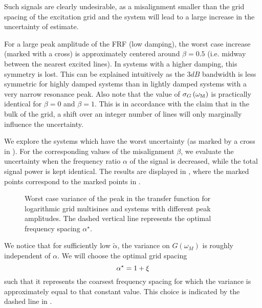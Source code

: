   Such signals are clearly undesirable, as a misalignment smaller than the grid spacing of the excitation grid and the system will lead to a large increase in the uncertainty of estimate.
  
  For a large peak amplitude of the FRF (low damping), the worst case increase (marked with a cross) is approximately centered around $\beta = 0.5$ (i.e. midway between the nearest excited lines).
  In systems with a higher damping, this symmetry is lost.
  This can be explained intuitively as the $3\unit{dB}$ bandwidth is less symmetric for highly damped systems than in lightly damped systems with a very narrow resonance peak.
  Also note that the value of $\sigma_G\left(\omega_{\mathrm{M}} \right)$ is practically identical for $\beta=0$ and $\beta=1$.
  This is in accordance with the claim that in the bulk of the grid, a shift over an integer number of lines will only marginally influence the uncertainty.
  
  We explore the systems which have the worst uncertainty (as marked by a cross in ).
  For the corresponding values of the misalignment $\beta$, we evaluate the uncertainty when the frequency ratio $\alpha$ of the signal is decreased, while the total signal power is kept identical.
  The results are displayed in , where the marked points correspond to the marked points in .
  
  \begin{figure}[ht]
    \centering
      \setlength{}
      \setlength\figureheight{0.68\figurewidth}
    
    \caption[Worst-case variance $\sigma_G^2\left( \wM \right)$ as a function of the frequency ratio $\alpha$.]{Worst case variance of the peak in the transfer function for logarithmic
             grid multisines and systems with different peak amplitudes.
             The dashed vertical line represents the optimal frequency spacing $\alpha^{\star}$.}
    \label{fig:worstCaseAlpha}
  \end{figure}

  We notice that for sufficiently low $\tilde{\alpha}$, the variance on $G\left( \omega_M \right)$ is roughly independent of $\alpha$.
  We will choose the optimal grid spacing
  \begin{equation}
    \alpha^{\star} = 1 + \xi
    \label{eq:optimAlpha}
  \end{equation}
  such that it represents the coarsest frequency spacing for which the variance is approximately equal to that constant value.
  This choice is indicated by the dashed line in .

